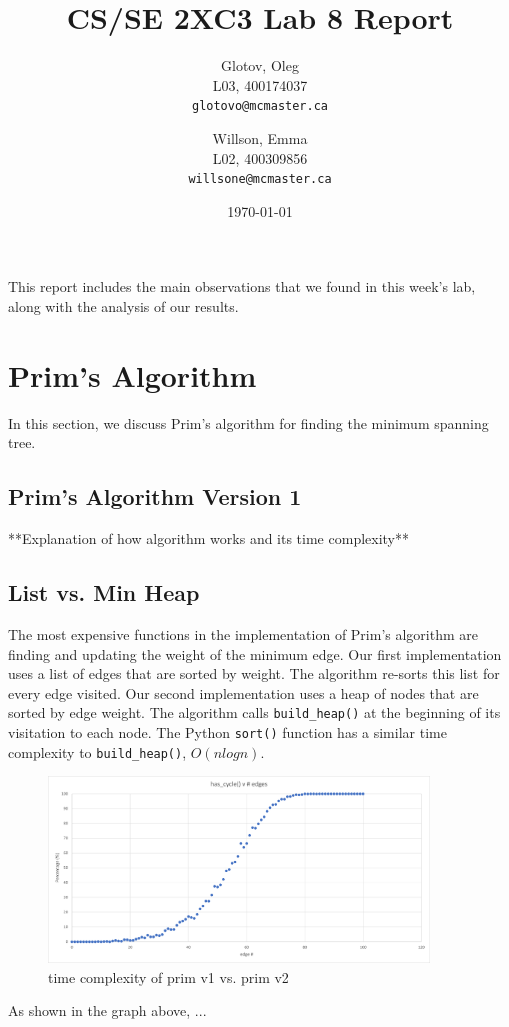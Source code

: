 \documentclass[12pt]{article}
\title{CS/SE 2XC3 Lab 8 Report}
\author{
  Glotov, Oleg\\ L03, 400174037\\
  \texttt{glotovo@mcmaster.ca}
  \and
  Willson, Emma\\ L02, 400309856\\
  \texttt{willsone@mcmaster.ca}
  }
\date{\today}
\begin{document}
\maketitle

This report includes the main observations that we found in this week's lab, along with the analysis of our results.

\newpage 
\section{Prim's Algorithm}
In this section, we discuss Prim's algorithm for finding the minimum spanning tree. 
\subsection{Prim's Algorithm Version 1}
**Explanation of how algorithm works and its time complexity**
\subsection{List vs. Min Heap}
The most expensive functions in the implementation of Prim's algorithm are finding and updating the weight of the minimum edge. Our first implementation uses a list of edges that are sorted by weight. The algorithm re-sorts this list for every edge visited. Our second implementation uses a heap of nodes that are sorted by edge weight. The algorithm calls \verb+build_heap()+ at the beginning of its visitation to each node. The Python \verb+sort()+ function has a similar time complexity to \verb+build_heap()+, $O(nlogn)$.
\begin{figure}[H]
\centering
\includegraphics[width=0.9\textwidth,height=\textheight,keepaspectratio]{cycle}
\caption{time complexity of prim v1 vs. prim v2}
\label{Figure: m1}
\end{figure}
\noindent As shown in the graph above, ... 
\end{document}
